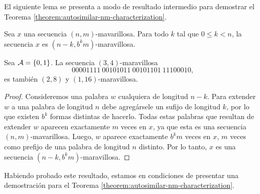 El siguiente lema se presenta a modo de resultado intermedio para
demostrar el Teorema \ref{theorem:autosimilar-nm-characterization}.

\begin{lemma} \label{lemma:marvellous-for-smaller-n}
	Sea $x$ una secuencia $(n,m)$-mavarillosa.
	Para todo $k$ tal que $0 \leq k < n$, la secuencia $x$ es
	$(n - k, b^{k}m)$-maravillosa.
\end{lemma}

\begin{example}
	Sea $\mathcal{A} = \lbrace 0, 1 \rbrace$.
	La secuencia $(3,4)$-maravillosa \[ 00001111\ 00101011\ 00101101\ 11100010, \]
	es también $(2,8)$ y $(1,16)$-maravillosa.
\end{example}

\begin{proof}
	Consideremos una palabra $w$ cualquiera de longitud $n - k$.
	Para extender $w$ a una palabra de longitud $n$ debe agregársele un sufijo de
	longitud $k$, por lo que existen $b^{k}$ formas distintas de hacerlo.
	Todas estas palabras que resultan de extender $w$ aparecen exactamente $m$
	veces en $x$, ya que esta es una secuencia $(n,m)$-mavarillosa.
	Luego, $w$ aparece exactamente $b^{k}m$ veces en $x$, $m$ veces como prefijo de
	una palabra de longitud $n$ distinto.
	Por lo tanto, $x$ es una secuencia $(n - k, b^{k}m)$-maravillosa.
\end{proof}

Habiendo probado este resultado, estamos en condiciones de presentar una
demostración para el Teorema \ref{theorem:autosimilar-nm-characterization}.

